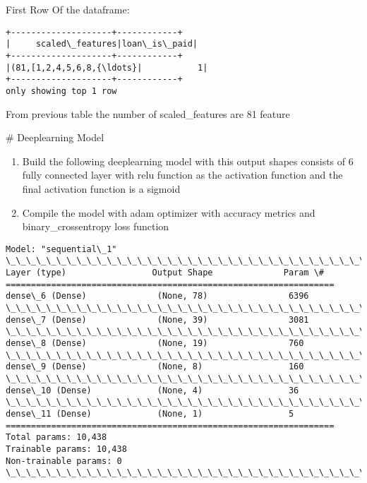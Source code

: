 \documentclass[11pt]{article}
\providecommand{\tightlist}{%
      \setlength{\itemsep}{0pt}\setlength{\parskip}{0pt}}
\begin{document}
    First Row Of the dataframe:

    \begin{Verbatim}[commandchars=\\\{\}]
+--------------------+------------+
|     scaled\_features|loan\_is\_paid|
+--------------------+------------+
|(81,[1,2,4,5,6,8,{\ldots}|           1|
+--------------------+------------+
only showing top 1 row

    \end{Verbatim}

    From previous table the number of scaled\_features are 81 feature

    \# Deeplearning Model

    \begin{enumerate}
\def\labelenumi{\arabic{enumi}.}
\tightlist
\item
  Build the following deeplearning model with this output shapes
  consists of 6 fully connected layer with relu function as the
  activation function and the final activation function is a sigmoid
\item
  Compile the model with adam optimizer with accuracy metrics and
  binary\_crossentropy loss function
\end{enumerate}

    \begin{Verbatim}[commandchars=\\\{\}]
Model: "sequential\_1"
\_\_\_\_\_\_\_\_\_\_\_\_\_\_\_\_\_\_\_\_\_\_\_\_\_\_\_\_\_\_\_\_\_\_\_\_\_\_\_\_\_\_\_\_\_\_\_\_\_\_\_\_\_\_\_\_\_\_\_\_\_\_\_\_\_
Layer (type)                 Output Shape              Param \#
=================================================================
dense\_6 (Dense)              (None, 78)                6396
\_\_\_\_\_\_\_\_\_\_\_\_\_\_\_\_\_\_\_\_\_\_\_\_\_\_\_\_\_\_\_\_\_\_\_\_\_\_\_\_\_\_\_\_\_\_\_\_\_\_\_\_\_\_\_\_\_\_\_\_\_\_\_\_\_
dense\_7 (Dense)              (None, 39)                3081
\_\_\_\_\_\_\_\_\_\_\_\_\_\_\_\_\_\_\_\_\_\_\_\_\_\_\_\_\_\_\_\_\_\_\_\_\_\_\_\_\_\_\_\_\_\_\_\_\_\_\_\_\_\_\_\_\_\_\_\_\_\_\_\_\_
dense\_8 (Dense)              (None, 19)                760
\_\_\_\_\_\_\_\_\_\_\_\_\_\_\_\_\_\_\_\_\_\_\_\_\_\_\_\_\_\_\_\_\_\_\_\_\_\_\_\_\_\_\_\_\_\_\_\_\_\_\_\_\_\_\_\_\_\_\_\_\_\_\_\_\_
dense\_9 (Dense)              (None, 8)                 160
\_\_\_\_\_\_\_\_\_\_\_\_\_\_\_\_\_\_\_\_\_\_\_\_\_\_\_\_\_\_\_\_\_\_\_\_\_\_\_\_\_\_\_\_\_\_\_\_\_\_\_\_\_\_\_\_\_\_\_\_\_\_\_\_\_
dense\_10 (Dense)             (None, 4)                 36
\_\_\_\_\_\_\_\_\_\_\_\_\_\_\_\_\_\_\_\_\_\_\_\_\_\_\_\_\_\_\_\_\_\_\_\_\_\_\_\_\_\_\_\_\_\_\_\_\_\_\_\_\_\_\_\_\_\_\_\_\_\_\_\_\_
dense\_11 (Dense)             (None, 1)                 5
=================================================================
Total params: 10,438
Trainable params: 10,438
Non-trainable params: 0
\_\_\_\_\_\_\_\_\_\_\_\_\_\_\_\_\_\_\_\_\_\_\_\_\_\_\_\_\_\_\_\_\_\_\_\_\_\_\_\_\_\_\_\_\_\_\_\_\_\_\_\_\_\_\_\_\_\_\_\_\_\_\_\_\_
    \end{Verbatim}
\end{document}

